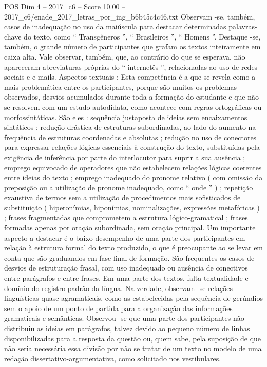 \begin{textsample}{POS Dim 4 – 2017\_c6 – Score 10.00 – 2017\_c6/enade\_2017\_letras\_por\_ing\_b6b45c4c46.txt}
Observam -se, também, casos de inadequação no uso da maiúscula para destacar determinadas palavras-chave do texto, como “ Transgêneros ”, “ Brasileiros ”, “ Homens ”.
Destaque -se, também, o grande número de participantes que grafam os textos inteiramente em caixa alta.
Vale observar, também, que, ao contrário do que se esperava, não apareceram abreviaturas próprias do “ internetês ”, relacionadas ao uso de redes sociais e e-mails.
Aspectos textuais : Esta competência é a que se revela como a mais problemática entre os participantes, porque são muitos os problemas observados, desvios acumulados durante toda a formação do estudante e que não se resolvem com um estudo autodidata, como acontece com regras ortográficas ou morfossintáticas.
São eles : sequência justaposta de ideias sem encaixamentos sintáticos ; redução drástica de estruturas subordinadas, ao lado do aumento na frequência de estruturas coordenadas e absolutas ; redução no uso de conectores para expressar relações lógicas essenciais à construção do texto, substituídas pela exigência de inferência por parte do interlocutor para suprir a sua ausência ; emprego equivocado de operadores que não estabelecem relações lógicas coerentes entre ideias do texto ; emprego inadequado do pronome relativo ( com omissão da preposição ou a utilização de pronome inadequado, como “ onde ” ) ; repetição exaustiva de termos sem a utilização de procedimentos mais sofisticados de substituição ( hiperonímias, hiponímias, nominalizações, expressões metafóricas ) ; frases fragmentadas que comprometem a estrutura lógico-gramatical ; frases formadas apenas por oração subordinada, sem oração principal.
Um importante aspecto a destacar é o baixo desempenho de uma parte dos participantes em relação à estrutura formal do texto produzido, o que é preocupante ao se levar em conta que são graduandos em fase final de formação.
São frequentes os casos de desvios de estruturação frasal, com uso inadequado ou ausência de conectivos entre parágrafos e entre frases.
Em uma parte dos textos, falta textualidade e domínio do registro padrão da língua.
Na verdade, observam -se relações linguísticas quase agramaticais, como as estabelecidas pela sequência de gerúndios sem o apoio de um ponto de partida para a organização das informações gramaticais e semânticas.
Observou -se que uma parte dos participantes não distribuiu as ideias em parágrafos, talvez devido ao pequeno número de linhas disponibilizadas para a resposta da questão ou, quem sabe, pela suposição de que não seria necessária essa divisão por não se tratar de um texto no modelo de uma redação dissertativo-argumentativa, como solicitado nos vestibulares.

\end{textsample}
